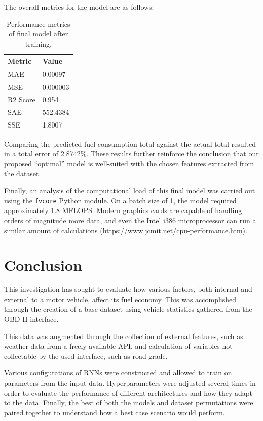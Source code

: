 \documentclass[letterpaper]{article}
\begin{document}
The overall metrics for the model are as follows:

\begin{table}[h!]
    \centering
    \small
    \begin{tabular}{|l|l|}
        \hline
        Metric & Value \\
        \hline
        MAE          	& 0.00097	\\
        MSE          	& 0.000003   \\
        R2 Score     	& 0.954  	\\
        SAE          	& 552.4384   \\
        SSE          	& 1.8007 \\
        \hline
    \end{tabular}
    \caption{Performance metrics of final model after training.}
    \label{tab:my-table}
\end{table}

Comparing the predicted fuel consumption total against the actual total 
resulted in a total error of 2.8742\%. These results further reinforce the 
conclusion that our proposed ``optimal'' model is well-suited with the 
chosen features extracted from the dataset.

Finally, an analysis of the computational load of this final model was 
carried out using the \verb|fvcore| Python module. On a batch size of 1, 
the model required approximately 1.8 MFLOPS. Modern graphics cards are 
capable of handling orders of magnitude more data, and even the Intel 
i386 microprocessor can run a similar amount of calculations 
(https://www.jcmit.net/cpu-performance.htm).

\section{Conclusion}

This investigation has sought to evaluate how various factors, both 
internal and external to a motor vehicle, affect its fuel economy. This 
was accomplished through the creation of a base dataset using vehicle 
statistics gathered from the OBD-II interface.

This data was augmented through the collection of external features, 
such as weather data from a freely-available API, and calculation of 
variables not collectable by the used interface, such as road grade.

Various configurations of RNNs were constructed and allowed to train on 
parameters from the input data. Hyperparameters were adjusted several 
times in order to evaluate the performance of different architectures 
and how they adapt to the data. Finally, the best of both the models and 
dataset permutations were paired together to understand how a best case 
scenario would perform.
\end{document}
